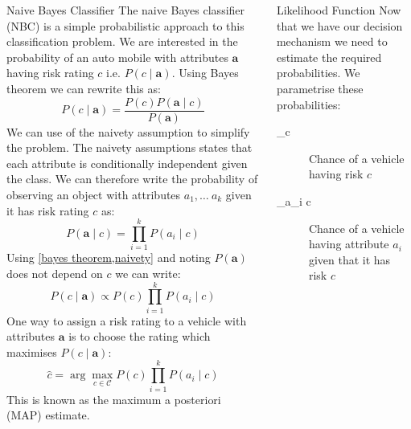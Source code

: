 \documentclass{beamer}
\begin{document}
\begin{frame}
\begin{columns}
\begin{column}{0.30\paperwidth}
		\begin{block}{Naive Bayes Classifier}
			The naive Bayes classifier (NBC) is a simple probabilistic approach to this classification problem. We are interested in the probability of an auto mobile with attributes $\mathbf{a}$ having risk rating $c$ i.e. $P(c \mid \mathbf{a})$. Using Bayes theorem we can rewrite this as:
			\begin{equation}\label{bayes theorem}
				P(c \mid \mathbf{a}) = \frac{P(c)P(\mathbf{a} \mid c)}{P(\mathbf{a})}
			\end{equation}
			We can use of the naivety assumption to simplify the problem.
			The naivety assumptions states that each attribute is conditionally independent given the class.
			We can therefore write the probability of observing an object with attributes $a_1, \dots\ a_k$ given it has risk rating $c$ as:
			\begin{equation} \label{naivety}
				P(\mathbf{a} \mid c) = \prod_{i=1}^k P(a_i \mid c)
			\end{equation}
			Using \cref{bayes theorem,naivety} and noting $P(\mathbf{a})$ does not depend on $c$ we can write:
			\begin{equation}
				P(c \mid \mathbf{a}) \propto P(c)\prod_{i=1}^{k}P(a_i \mid c)
			\end{equation}
			One way to assign a risk rating to a vehicle with attributes $\mathbf{a}$ is to choose the rating which maximises $P(c \mid \mathbf{a})$:
			\begin{equation} \label{map_estimate}
				\hat c = \arg\max_{c \in \mathcal{C}} P(c)\prod_{i=1}^{k}P(a_i \mid c)
			\end{equation}
			This is known as the maximum a posteriori (MAP) estimate.
		\end{block}

	\end{column}

	\begin{column}{0.30\paperwidth}

		\begin{block}{Likelihood Function}
			Now that we have our decision mechanism we need to estimate the required probabilities. We parametrise these probabilities:
			\begin{description}
				\item[\theta_c] Chance of a vehicle having risk $c$
				\item[\theta_{a_i \mid c}] Chance of a vehicle having attribute $a_i$ given that it has risk $c$
			\end{description}\vspace{0.5em}


\end{block}
\end{column}
\end{columns}
\end{frame}
\end{document}
